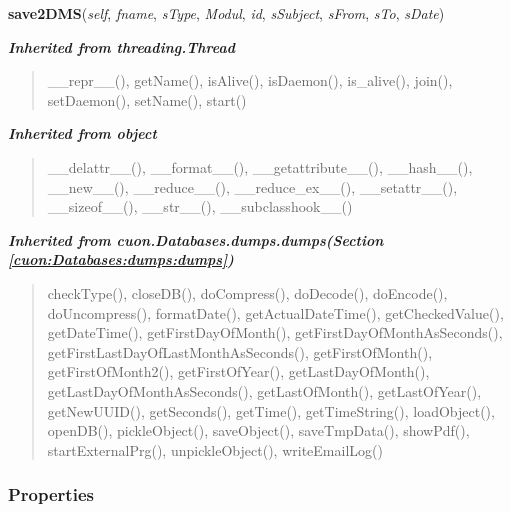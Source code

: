     \vspace{0.5ex}

\hspace{.8\funcindent}\begin{boxedminipage}{\funcwidth}

    \raggedright \textbf{save2DMS}(\textit{self}, \textit{fname}, \textit{sType}, \textit{Modul}, \textit{id}, \textit{sSubject}, \textit{sFrom}, \textit{sTo}, \textit{sDate})

\setlength{\parskip}{2ex}
\setlength{\parskip}{1ex}
    \end{boxedminipage}


\large{\textbf{\textit{Inherited from threading.Thread}}}

\begin{quote}
\_\_repr\_\_(), getName(), isAlive(), isDaemon(), is\_alive(), join(), setDaemon(), setName(), start()
\end{quote}

\large{\textbf{\textit{Inherited from object}}}

\begin{quote}
\_\_delattr\_\_(), \_\_format\_\_(), \_\_getattribute\_\_(), \_\_hash\_\_(), \_\_new\_\_(), \_\_reduce\_\_(), \_\_reduce\_ex\_\_(), \_\_setattr\_\_(), \_\_sizeof\_\_(), \_\_str\_\_(), \_\_subclasshook\_\_()
\end{quote}

\large{\textbf{\textit{Inherited from cuon.Databases.dumps.dumps\textit{(Section \ref{cuon:Databases:dumps:dumps})}}}}

\begin{quote}
checkType(), closeDB(), doCompress(), doDecode(), doEncode(), doUncompress(), formatDate(), getActualDateTime(), getCheckedValue(), getDateTime(), getFirstDayOfMonth(), getFirstDayOfMonthAsSeconds(), getFirstLastDayOfLastMonthAsSeconds(), getFirstOfMonth(), getFirstOfMonth2(), getFirstOfYear(), getLastDayOfMonth(), getLastDayOfMonthAsSeconds(), getLastOfMonth(), getLastOfYear(), getNewUUID(), getSeconds(), getTime(), getTimeString(), loadObject(), openDB(), pickleObject(), saveObject(), saveTmpData(), showPdf(), startExternalPrg(), unpickleObject(), writeEmailLog()
\end{quote}


  \subsubsection{Properties}

